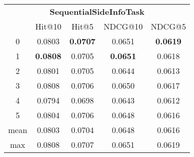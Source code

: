 \documentclass{article}
\begin{document}
 

\begin{tabular}{c|cccc}

\multicolumn{5}{c}{\textbf{SequentialSideInfoTask}} \\
\noalign{\smallskip}
\noalign{\smallskip}
\toprule
\multicolumn{1}{c}{Template ID}	&	\multicolumn{1}{|c}{Hit@10}	&	\multicolumn{1}{c}{Hit@5}	&	\multicolumn{1}{c}{NDCG@10}	&	\multicolumn{1}{c}{NDCG@5}\\
\midrule
0	&	0.0803	&	\textbf{0.0707}	&	0.0651	&	\textbf{0.0619}\\
1	&	\textbf{0.0808}	&	0.0705	&	\textbf{0.0651}	&	0.0618\\
2	&	0.0801	&	0.0705	&	0.0644	&	0.0613\\
3	&	0.0808	&	0.0706	&	0.0650	&	0.0617\\
4	&	0.0794	&	0.0698	&	0.0643	&	0.0612\\
5	&	0.0804	&	0.0706	&	0.0648	&	0.0616\\
\midrule
mean	&	0.0803	&	0.0704	&	0.0648	&	0.0616\\
max	&	0.0808	&	0.0707	&	0.0651	&	0.0619\\
\bottomrule

\end{tabular}
\end{document}
